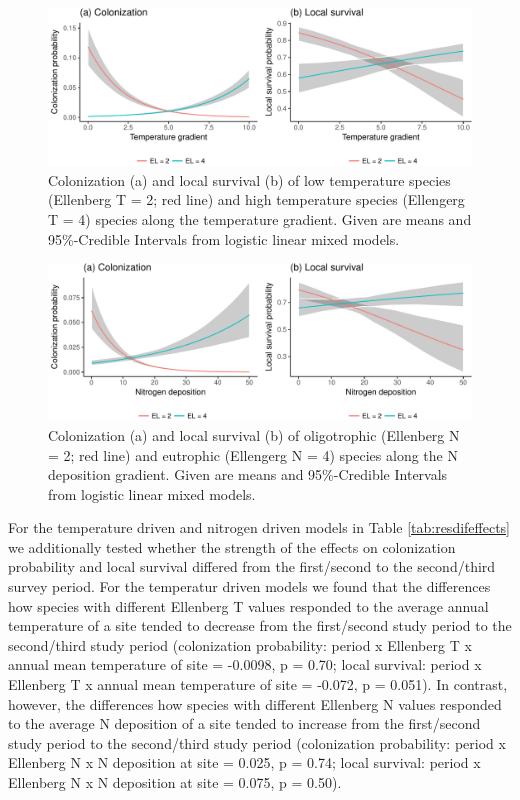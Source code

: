 \documentclass[fleqn,10pt,lineno]{wlpeerj} %
\theoremstyle{definition}
\theoremstyle{definition}
\theoremstyle{definition}
\theoremstyle{remark}
\begin{document}
\begin{figure}
\includegraphics[width=1\linewidth]{Manuscript_files/figure-latex/Teff-1} \caption{Colonization (a) and local survival (b) of low temperature species (Ellenberg T = 2; red line) and high temperature species (Ellengerg T = 4) species along the temperature gradient. Given are means and 95\%-Credible Intervals from logistic linear mixed models.}\label{fig:Teff}
\end{figure}

\begin{figure}
\includegraphics[width=1\linewidth]{Manuscript_files/figure-latex/Neff-1} \caption{Colonization (a) and local survival (b) of oligotrophic (Ellenberg N = 2; red line) and eutrophic (Ellengerg N = 4) species along the N deposition gradient. Given are means and 95\%-Credible Intervals from logistic linear mixed models.}\label{fig:Neff}
\end{figure}

For the temperature driven and nitrogen driven models in Table
\ref{tab:resdifeffects} we additionally tested whether the strength of
the effects on colonization probability and local survival differed from
the first/second to the second/third survey period. For the temperatur
driven models we found that the differences how species with different
Ellenberg T values responded to the average annual temperature of a site
tended to decrease from the first/second study period to the
second/third study period (colonization probability: period x Ellenberg
T x annual mean temperature of site = -0.0098, p = 0.70; local survival:
period x Ellenberg T x annual mean temperature of site = -0.072, p =
0.051). In contrast, however, the differences how species with different
Ellenberg N values responded to the average N deposition of a site
tended to increase from the first/second study period to the
second/third study period (colonization probability: period x Ellenberg
N x N deposition at site = 0.025, p = 0.74; local survival: period x
Ellenberg N x N deposition at site = 0.075, p = 0.50).
\end{document}

